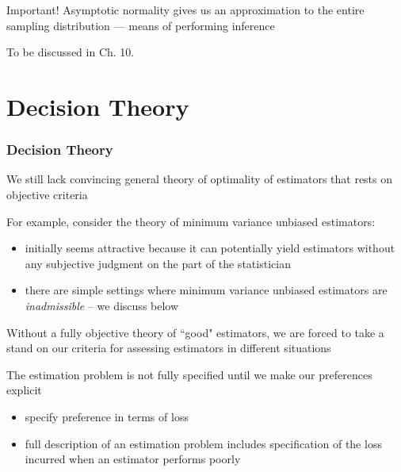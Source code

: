 \begin{frame}

    \vspace{2em}
    Important! Asymptotic normality gives us an
    approximation to the entire sampling distribution 
    ---  means of performing inference
    
    To be discussed in Ch. 10.
    
\end{frame}

\section{Decision Theory}

\begin{frame}\frametitle{Decision Theory}

    \vspace{2em}
    We still lack convincing general theory of optimality of
    estimators that rests on objective criteria
    
    \vspace{.7em}
    For example, consider the theory of minimum variance
    unbiased estimators:
    \begin{itemize}
        \item initially seems attractive because it can potentially
            yield estimators without any subjective judgment on the part of the
            statistician
        \item there are simple settings where minimum variance unbiased
    estimators are \emph{inadmissible} -- we discuss below
    
    \end{itemize}

\end{frame}

\begin{frame}

    \vspace{2em}
    Without a fully objective theory of ``good" estimators,  
    we are forced to take a stand on our
    criteria for assessing estimators in different situations
    
    \vspace{.7em}
    The estimation problem is not fully specified until we make our
    preferences explicit
    
    \begin{itemize}
        \item specify preference in terms of loss 
        \item full description of an estimation problem
            includes specification of the loss incurred when an estimator performs
            poorly
    \end{itemize}
    
\end{frame}

